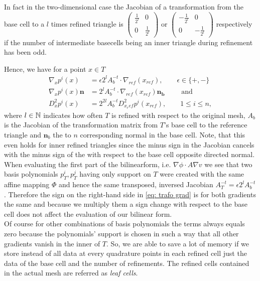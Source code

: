 \begin{example}
In fact in the two-dimensional case the Jacobian of a transformation from the base cell to a $l$ times refined triangle is $
	\begin{pmatrix}
		\frac 1 {2^l} & 0 \\ 0 & \frac 1 {2^l}
	\end{pmatrix} \text{ or }
	\begin{pmatrix}
		-\frac 1 {2^l} & 0 \\ 0 & -\frac 1 {2^l}
	\end{pmatrix}$ respectively if the number of intermediate basecells being an inner triangle during refinement  has been odd.

Hence, we have for a point $x \in T$
\begin{align}
\nabla_x p^i(x) &= \epsilon 2^l A_b^{-t} \cdot \nabla_{ref}(x_{ref}), \qquad \epsilon \in \{+,-\} \label{eq: trafo grad}\\
\nabla_x p^i(x) \mathbf n &= 2^l A_b^{-t} \cdot \nabla_{ref}(x_{ref}) \mathbf{ n_{b}} \qquad \text{ and } \\
D_x^2 p^i(x) &= 2^{2l} A_b^{-t} D_{x_ref}^2 p^i(x_{ref}), \qquad 1 \leq i \leq n,
\end{align}
where $l \in \mathbb{N}$ indicates how often $T$ is refined with respect to the original mesh, $A_b$ is the Jacobian of the transformation matrix from $T$'s base cell to the reference triangle and $\mathbf n_b$ the to $n$ corresponding normal in the base cell. Note, that this even holds for inner refined triangles since the minus sign in the Jacobian cancels with the minus sign of the with respect to the base cell opposite directed normal.\\
When evaluating the first part of the bilinearform, i.e. $\nabla \phi \cdot A \nabla v$ we see that two basis polynomials $p_T^i, p_T^j$ having only support on $T$ were created with the same affine mapping $\Phi$ and hence the same transposed, inversed Jacobian $A^{-t}_T=\epsilon 2^l A_b^{-t}$. Therefore the sign on the right-hand side in \eqref{eq: trafo grad} is for both gradients the same and because we multiply them a sign change with respect to the base cell does not affect the evaluation of our bilinear form.\\
Of course for other combinations of basis polynomials the terms always equals zero because the polynomials' support is chosen in such a way that all other gradients vanish in the inner of $T$.
So, we are able to save a lot of memory if we store instead of all data at every quadrature points in each refined cell just the data of the base cell and the number of refinements. The refined cells contained in the actual mesh are referred as \emph{leaf cells}.
\end{example}

